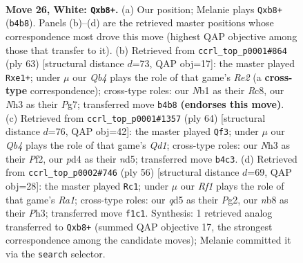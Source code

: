 \documentclass[11pt]{article}
\begin{document}
\clearpage

\begin{figure}[p]\centering
\begin{subfigure}{0.46\textwidth}\centering
\resizebox{\linewidth}{!}{%
\newchessgame
\chessboard[
  setfen={1n4k1/5p2/5np1/3q3p/1Q1p3P/3P2PN/5P2/rN3RK1 w - - 2 26},
  showmover=false,
  pgfstyle=straightmove, color=movearrow, markmove={b4-b8}
]}
\caption{}
\end{subfigure}\hfill
\begin{subfigure}{0.46\textwidth}\centering
\resizebox{\linewidth}{!}{%
\newchessgame
\chessboard[
  setfen={2r3k1/4rpp1/p6p/2np1Q2/P2N4/5P1P/2P3P1/4R1K1 b - - 0 32},
  showmover=false,
  pgfstyle=straightmove, color=movearrow, markmove={e7-e1}
]}
\caption{}
\end{subfigure}
\\[4pt]
\begin{subfigure}{0.46\textwidth}\centering
\resizebox{\linewidth}{!}{%
\newchessgame
\chessboard[
  setfen={4R3/p1q2ppk/1p5p/3n4/3r4/P2N2PP/1P3P2/3Q2K1 w - - 1 33},
  showmover=false,
  pgfstyle=straightmove, color=movearrow, markmove={d1-f3}
]}
\caption{}
\end{subfigure}\hfill
\begin{subfigure}{0.46\textwidth}\centering
\resizebox{\linewidth}{!}{%
\newchessgame
\chessboard[
  setfen={1k6/1pq3p1/p1p2nQ1/8/PPN4r/7P/5PP1/R6K w - - 1 29},
  showmover=false,
  pgfstyle=straightmove, color=movearrow, markmove={a1-c1}
]}
\caption{}
\end{subfigure}
\caption{\textbf{Move 26, White: \texttt{Qxb8+}.} (a) Our position; Melanie plays \texttt{Qxb8+} (\texttt{b4b8}). Panels (b)--(d) are the retrieved master positions whose correspondence most drove this move (highest QAP objective among those that transfer to it). (b) Retrieved from \texttt{ccrl\_top\_p0001\#864} (ply 63) [structural distance $d$=73, QAP obj=17]: the master played \texttt{Rxe1+}; under $\mu$ our \emph{Qb4} plays the role of that game's \emph{Re2} (a \textbf{cross-type} correspondence); cross-type roles: our \emph{N}b1 as their \emph{R}c8, our \emph{N}h3 as their \emph{P}g7; transferred move \texttt{b4b8} \textbf{(endorses this move)}. (c) Retrieved from \texttt{ccrl\_top\_p0001\#1357} (ply 64) [structural distance $d$=76, QAP obj=42]: the master played \texttt{Qf3}; under $\mu$ our \emph{Qb4} plays the role of that game's \emph{Qd1}; cross-type roles: our \emph{N}h3 as their \emph{P}f2, our \emph{p}d4 as their \emph{n}d5; transferred move \texttt{b4c3}. (d) Retrieved from \texttt{ccrl\_top\_p0002\#746} (ply 56) [structural distance $d$=69, QAP obj=28]: the master played \texttt{Rc1}; under $\mu$ our \emph{Rf1} plays the role of that game's \emph{Ra1}; cross-type roles: our \emph{q}d5 as their \emph{P}g2, our \emph{n}b8 as their \emph{P}h3; transferred move \texttt{f1c1}. Synthesis: 1 retrieved analog transferred to \texttt{Qxb8+} (summed QAP objective 17, the strongest correspondence among the candidate moves); Melanie committed it via the \texttt{search} selector.}
\label{fig:thought-m50}
\end{figure}
\end{document}
